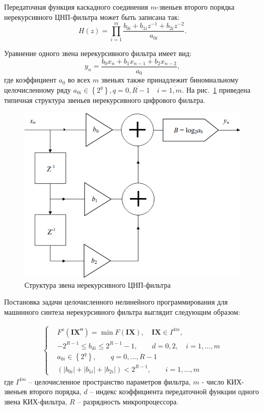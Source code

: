 \documentclass[a4paper,14pt]{extarticle}
\begin{document}
Передаточная функция каскадного соединения $m$-звеньев второго порядка нерекурсивного ЦНП-фильтра может быть записана так:
\begin{equation}
  H(z)=\prod_{i=1}^{m} \frac{b_{0 i}+b_{1 i} z^{-1}+b_{2 i} z^{-2}}{a_{0 i}}.
\end{equation}

Уравнение одного звена нерекурсивного фильтра имеет вид:
\begin{equation}
  y_{n}=\frac{b_{0} x_{n}+b_{1} x_{n-1}+b_{2} x_{n-2}}{a_0},
\end{equation}
где коэффициент $a_0$  во всех  $m$  звеньях также принадлежит биномиальному целочисленному ряду $a_{0 i} \in\left\{2^{q}\right\}, q=\overline{0, R-1} \quad i=\overline{1, m}$. На рис. \ref{fig:figure2} приведена типичная структура звеньев нерекурсивного цифрового фильтра.

\begin{figure}[H]
  \centering
  \includegraphics[width=\textwidth]{img/img2}
  \caption{Структура звена нерекурсивного ЦНП-фильтра}
  \label{fig:figure2}
\end{figure}

Постановка задачи целочисленного нелинейного программирования для машинного синтеза нерекурсивного фильтра выглядит следующим образом:

\begin{gather}
\left\{\begin{aligned}
  &F^{o}\left(\boldsymbol{I X}^{\boldsymbol{o}}\right)=
    \min F(\boldsymbol{I X}),  \quad
      \boldsymbol{I X} \in I^{4 m},\\
  &-2^{R-1} \leq b_{d i} \leq 2^{R-1}-1, \quad \quad d=0,2, \quad i=1,\ldots,m\\
  &a_{0 i} \in\left\{2^{q}\right\}, \quad \quad q=0,\ldots,R-1\\
  &\left(\left|b_{0 i}\right|+\left|b_{1 i}\right|+\left|b_{2 i}\right|\right)<2^{R-1}, \quad \quad i=1,\ldots,m
\end{aligned}\right.
\end{gather}
где $I^{4m}$ -- целочисленное пространство параметров фильтра, $m$ - число КИХ-звеньев второго
порядка, $d$ -- индекс коэффициента передаточной функции одного звена КИХ-фильтра, $R$ -- разрядность микропроцессора. 
\end{document}
